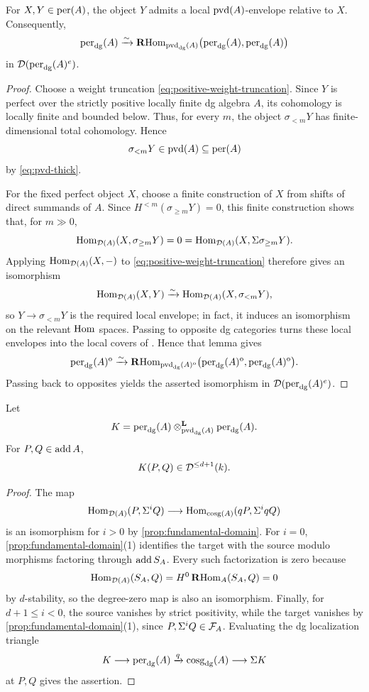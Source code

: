 \documentclass[11pt,a4paper,dvipsnames,x11names]{amsart}
\begin{document}
\begin{lem}\label{lem:local-envelope}
For $X,Y\in\operatorname{per}(A)$, the object $Y$ admits a local $\operatorname{pvd}(A)$-envelope relative to $X$. Consequently,
\[
\operatorname{per}_{\mathrm{dg}}(A)\xrightarrow{\sim}
\operatorname{\mathbf{R}Hom}_{\operatorname{pvd}_{\mathrm{dg}}(A)}\bigl(\operatorname{per}_{\mathrm{dg}}(A),\operatorname{per}_{\mathrm{dg}}(A)\bigr)
\]
in $\mathcal D(\operatorname{per}_{\mathrm{dg}}(A)^e)$.
\end{lem}

\begin{proof}
Choose a weight truncation \eqref{eq:positive-weight-truncation}. Since $Y$ is perfect over the strictly positive locally finite dg algebra $A$, its cohomology is locally finite and bounded below. Thus, for every $m$, the object $\sigma_{<m}Y$ has finite-dimensional total cohomology. Hence
\[
    \sigma_{<m}Y\in\operatorname{pvd}(A)\subseteq\operatorname{per}(A)
\]
by \eqref{eq:pvd-thick}.

For the fixed perfect object $X$, choose a finite construction of $X$ from shifts of direct summands of $A$. Since $H^{<m}(\sigma_{\geq m}Y)=0$, this finite construction shows that, for $m\gg0$,
\[
    \operatorname{Hom}_{\mathcal D(A)}(X,\sigma_{\geq m}Y)=0
    =\operatorname{Hom}_{\mathcal D(A)}(X,\Sigma\sigma_{\geq m}Y).
\]
Applying $\operatorname{Hom}_{\mathcal D(A)}(X,-)$ to \eqref{eq:positive-weight-truncation} therefore gives an isomorphism
\[
    \operatorname{Hom}_{\mathcal D(A)}(X,Y)\xrightarrow{\sim}\operatorname{Hom}_{\mathcal D(A)}(X,\sigma_{<m}Y),
\]
so $Y\to\sigma_{<m}Y$ is the required local envelope; in fact, it induces an isomorphism on the relevant $\operatorname{Hom}$ spaces. Passing to opposite dg categories turns these local envelopes into the local covers of \cite[Lemma~4.3.4]{HaniharaLiu26}. Hence that lemma gives
\[
\operatorname{per}_{\mathrm{dg}}(A)^{\mathrm{o}}\xrightarrow{\sim}
\operatorname{\mathbf{R}Hom}_{\operatorname{pvd}_{\mathrm{dg}}(A)^{\mathrm{o}}}\bigl(\operatorname{per}_{\mathrm{dg}}(A)^{\mathrm{o}},\operatorname{per}_{\mathrm{dg}}(A)^{\mathrm{o}}\bigr).
\]
Passing back to opposites yields the asserted isomorphism in $\mathcal D(\operatorname{per}_{\mathrm{dg}}(A)^e)$.
\end{proof}

\begin{lem}\label{lem:localization-amplitude}
Let
\[
K=\operatorname{per}_{\mathrm{dg}}(A)\otimes^{\mathbf L}_{\operatorname{pvd}_{\mathrm{dg}}(A)}\operatorname{per}_{\mathrm{dg}}(A).
\]
For $P,Q\in\operatorname{add} A$,
\[
K(P,Q)\in \mathcal D^{\leq d+1}(k).
\]
\end{lem}

\begin{proof}
The map
\[
\operatorname{Hom}_{\mathcal D(A)}(P,\Sigma^iQ)\longrightarrow\operatorname{Hom}_{\operatorname{cosg}(A)}(qP,\Sigma^iqQ)
\]
is an isomorphism for $i>0$ by \cref{prop:fundamental-domain}. For $i=0$, \cref{prop:fundamental-domain}(1) identifies the target with the source modulo morphisms factoring through $\operatorname{add} S_A$. Every such factorization is zero because
\[
    \operatorname{Hom}_{\mathcal D(A)}(S_A,Q)=H^0\operatorname{\mathbf{R}Hom}_A(S_A,Q)=0
\]
by $d$-stability, so the degree-zero map is also an isomorphism. Finally, for $d+1\leq i<0$, the source vanishes by strict positivity, while the target vanishes by \cref{prop:fundamental-domain}(1), since $P,\Sigma^iQ\in\mathcal F_A$. Evaluating the dg localization triangle
\[
K\longrightarrow\operatorname{per}_{\mathrm{dg}}(A)\xrightarrow{q}\operatorname{cosg}_{\mathrm{dg}}(A)\longrightarrow\Sigma K
\]
at $P,Q$ gives the assertion.
\end{proof}
\end{document}
